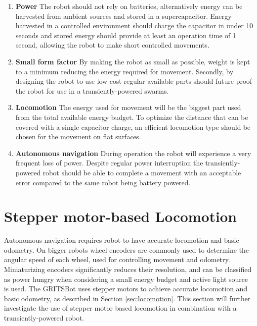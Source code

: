 
\begin{enumerate}
\item \textbf{Power} The robot should not rely on batteries, alternatively energy can be harvested from ambient sources and stored in a supercapacitor. 
Energy harvested in a controlled environment should charge the capacitor in under 10 seconds and stored energy should provide at least an operation time of 1 second, allowing the robot to make short controlled movements.

\item \textbf{Small form factor} By making the robot as small as possible, weight is kept to a minimum reducing the energy required for movement.
Secondly, by designing the robot to use low cost regular available parts should future proof the robot for use in a transiently-powered swarms.

\item \textbf{Locomotion}
The energy used for movement will be the biggest part used from the total available energy budget.
To optimize the distance that can be covered with a single capacitor charge, an efficient locomotion type should be chosen for the movement on flat surfaces.

\item \textbf{Autonomous navigation}
During operation the robot will experience a very frequent loss of power. 
Despite regular power interruption the transiently-powered robot should be able to complete a movement with an acceptable error compared to the same robot being battery powered. 

\end{enumerate}




\section{Stepper motor-based Locomotion}

Autonomous navigation requires robot to have accurate locomotion and basic odometry.
On bigger robots wheel encoders are commonly used to determine the angular speed of each wheel, used for controlling movement and odometry.
Miniaturizing encoders significantly reduces their resolution, and can be classified as power hungry when considering a small energy budget and active light source is used.
The GRITSBot uses stepper motors to achieve accurate locomotion and basic odometry, as described in Section \ref{sec:locomotion}.
This section will further investigate the use of stepper motor based locomotion in combination with a transiently-powered robot.

